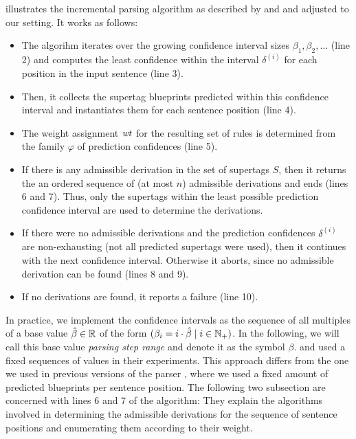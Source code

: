 \documentclass[../../document.tex]{subfiles}
\begin{document}
     illustrates the incremental parsing algorithm as described by \citet[Section~5.1]{Clark04} and \citet[Section~2.2.2]{Auli12} and adjusted to our setting.
    It works as follows:
    \begin{itemize}
        \item The algorihm iterates over the growing confidence interval sizes \(\beta_1, \beta_2, \ldots\) (line 2) and computes the least confidence within the interval \(\delta^{(i)}\) for each position in the input sentence (line 3).
        \item Then, it collects the supertag blueprints predicted within this confidence interval and instantiates them for each sentence position (line 4).
        \item The weight assignment \(\mathit{wt}\) for the resulting set of rules is determined from the family \(\varphi\) of prediction confidences (line 5).
        \item If there is any admissible derivation in the set of supertags \(S\), then it returns the an ordered sequence of (at most \(n\)) admissible derivations and ends (lines 6 and 7). Thus, only the supertags within the least possible prediction confidence interval are used to determine the derivations.
        \item If there were no admissible derivations and the prediction confidences \(\delta^{(i)}\) are non-exhausting (not all predicted supertags were used), then it continues with the next confidence interval. Otherwise it aborts, since no admissible derivation can be found (lines 8 and 9).
        \item If no derivations are found, it reports a failure (line 10).
    \end{itemize}
    In practice, we implement the confidence intervals as the sequence of all multiples of a base value \(\hat{\beta}\in \mathbb{R}\) of the form \((\beta_i = i \cdot \hat{\beta} \mid i \in \mathbb{N}_+)\).
    In the following, we will call this base value \emph{parsing step range} and denote it as the symbol \(\beta\).
     and \citet{Auli12} used a fixed sequences of values in their experiments.
    This approach differs from the one we used in previous versions of the parser \citep{RupMoe21, Rup22}, where we used a fixed amount of predicted blueprints per sentence position.
    The following two subsection are concerned with lines 6 and 7 of the algorithm:
        They explain the algorithms involved in determining the admissible derivations for the sequence of sentence positions and enumerating them according to their weight.
\end{document}
